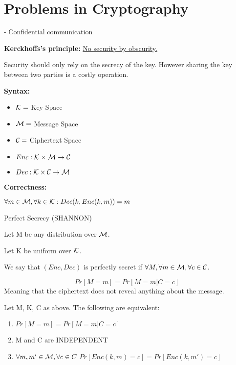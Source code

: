 
\section{Problems in Cryptography}

- Confidential communication 


\textbf{Kerckhoffs's principle:} \underline{No security by obscurity.}

Security should only rely on the secrecy of the key. However sharing the key between two parties is a costly operation.

\textbf{Syntax:}
\begin{itemize}
    \item $\mathcal{K} = $ Key Space
    \item $\mathcal{M} = $ Message Space
    \item $\mathcal{C} = $ Ciphertext Space
    \item $Enc: \mathcal{K} \times \mathcal{M} \to \mathcal{C}$
    \item $Dec: \mathcal{K} \times \mathcal{C} \to \mathcal{M}$
\end{itemize}

\textbf{Correctness:}

$\forall m \in \mathcal{M}, \forall k \in \mathcal{K} : Dec(k, Enc(k,m))=m$

\begin{definition}
    Perfect Secrecy (SHANNON)

    Let M be any distribution over $\mathcal{M}$.

    Let K be uniform over $\mathcal{K}$.

    We say that $(Enc, Dec)$ is perfectly secret if $\forall M, \forall m \in \mathcal{M}, \forall c \in \mathcal{C}$.

    $$Pr[M=m]=Pr[M=m|C=c]$$
    Meaning that the ciphertext does not reveal anything about the message.
\end{definition}

\begin{theorem}
    Let M, K, C as above. The following are equivalent:
\end{theorem}

\begin{enumerate}[I]
    \item $Pr[M=m]=Pr[M=m|C=c]$
    \item M and C are INDEPENDENT
    \item $\forall m, m' \in \mathcal{M}, \forall c \in C$ $Pr[Enc(k,m)=c]=Pr[Enc(k,m')=c]$
\end{enumerate}

